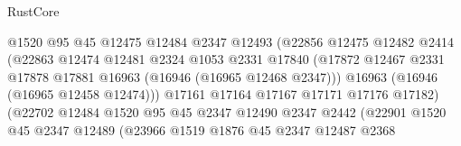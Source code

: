 \begin{lexlean}{RustCore}
\begin{coremodule}
                                      @1520
                                      @95
                                      @45
                                      @12475
                                      @12484
                                      @2347
                                      @12493
                                      (@22856
                                        @12475
                                        @12482
                                        @2414
                                        (@22863
                                          @12474
                                          @12481
                                          @2324
                                          @1053
                                          @2331
                                          @17840
                                          (@17872
                                            @12467
                                            @2331
                                            @17878
                                            @17881
                                            @16963
                                            (@16946 (@16965 @12468 @2347)))
                                          @16963
                                          (@16946 (@16965 @12458 @12474)))
                                        @17161
                                        @17164
                                        @17167
                                        @17171
                                        @17176
                                        @17182)
                                      (@22702
                                        @12484
                                        @1520
                                        @95
                                        @45
                                        @2347
                                        @12490
                                        @2347
                                        @2442
                                        (@22901
                                          @1520
                                          @45
                                          @2347
                                          @12489
                                          (@23966
                                            @1519
                                            @1876
                                            @45
                                            @2347
                                            @12487
                                            @2368

\end{coremodule}
\end{lexlean}
